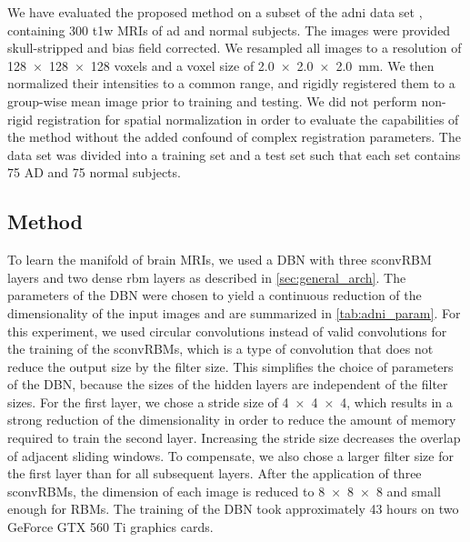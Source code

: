 We have evaluated the proposed method on a subset of the \gls{adni} data set
\citep{petersen2010}, containing 300 \gls{t1w} MRIs of \gls{ad} and normal
subjects. The images were provided skull-stripped and bias field corrected. We
resampled all images to a resolution of \num{128x128x128} voxels and a voxel
size of \SI{2.0x2.0x2.0}{\milli\meter}. We then normalized their intensities to
a common range, and rigidly registered them to a group-wise mean image prior to
training and testing. We did not perform non-rigid registration for spatial
normalization in order to evaluate the capabilities of the method without the
added confound of complex registration parameters. The data set was divided into
a training set and a test set such that each set contains 75 AD and 75 normal
subjects.

\subsection{Method}

To learn the manifold of brain MRIs, we used a DBN with three sconvRBM layers
and two dense \gls{rbm} layers as described in \ref{sec:general_arch}. The
parameters of the DBN were chosen to yield a continuous reduction of the
dimensionality of the input images and are summarized in \ref{tab:adni_param}.
For this experiment, we used circular convolutions instead of valid convolutions
for the training of the sconvRBMs, which is a type of convolution that does not
reduce the output size by the filter size. This simplifies the choice of
parameters of the DBN, because the sizes of the hidden layers are independent of
the filter sizes. For the first layer, we chose a stride size of \num{4x4x4},
which results in a strong reduction of the dimensionality in order to reduce the
amount of memory required to train the second layer. Increasing the stride size
decreases the overlap of adjacent sliding windows. To compensate, we also chose
a larger filter size for the first layer than for all subsequent layers. After
the application of three sconvRBMs, the dimension of each image is reduced to
\num{8x8x8} and small enough for RBMs. The training of the DBN took
approximately 43 hours on two GeForce GTX 560 Ti graphics cards.


